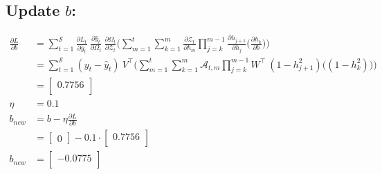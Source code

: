 \documentclass{article}
\begin{document}
\subsection{Update $b$:}
\begin{align*}
     \frac{\partial L}{ \partial{b}} &=
\sum_{t=1}^{\mathcal{S}}
\frac{\partial L_t}{\partial \hat{y}_t}~\frac{\partial \hat{y}_t}{\partial \Omega_t}~\frac{\partial \Omega_t}{ \partial \mathcal{Z}_t} \biggl( 
\sum_{m=1}^{t}
\sum_{k=1}^{m} \frac{\partial \mathcal{Z}_t}{ \partial h_m} 
\prod_{j=k}^{m-1} \frac{\partial h_{j+1}}{ \partial h_j} 
\biggl( \frac{\partial h_k}{ \partial b} \biggl) \biggl)\\
  &=
\sum_{t=1}^{\mathcal{S}}
(y_t - \hat{y}_t)~V^\top \biggl( 
\sum_{m=1}^{t}
\sum_{k=1}^{m} \mathcal{A}_{t,m} 
\prod_{j=k}^{m-1} W^\top ~ (1 - h_{j+1}^2)
\biggl( (1-h_k^2) \biggl) \biggl) \\
 &=\begin{bmatrix}
0.7756 \\
\end{bmatrix} \\
\eta &= 0.1\\
b_{new} &= b - \eta \frac{\partial L}{\partial b}\\
 &= \begin{bmatrix}
0
\end{bmatrix}- 0.1 \cdot \begin{bmatrix}
0.7756 \\
\end{bmatrix} \\
b_{new} &= \begin{bmatrix}
-0.0775 \\
\end{bmatrix}
\end{align*}
\end{document}

